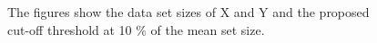 \begin{figure}[H]
  \centering
  \hfill
  \caption[Data set sizes]{The figures show the data set sizes of X and Y and the proposed cut-off threshold at 10 $\%$ of the mean set size.}
\end{figure}



